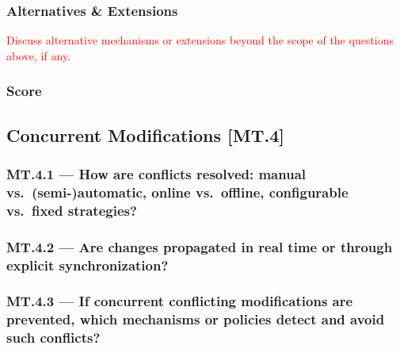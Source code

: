 \documentclass[sigconf,review]{acmart}
\begin{document}


\subsubsection*{Alternatives \& Extensions}
\label{sec:MT3-Alternatives-Extensions}

\textcolor{red}{Discuss alternative mechanisms or extensions beyond the 
scope of the questions above, if any.}

\subsubsection*{Score}
\label{sec:MT3-Score}



\subsection{Concurrent Modifications [MT.4]}
\label{sec:MT4}

\subsubsection*{MT.4.1 --- How are conflicts resolved: manual vs.\ (semi-)automatic, online vs.\ offline, configurable vs.\ fixed strategies?}
\label{sec:MT4-1}



\subsubsection*{MT.4.2 --- Are changes propagated in real time or through explicit synchronization?}
\label{sec:MT4-2}



\subsubsection*{MT.4.3 --- If concurrent conflicting modifications are prevented, which mechanisms or policies detect and avoid such conflicts?}
\label{sec:MT4-3}

\end{document}
